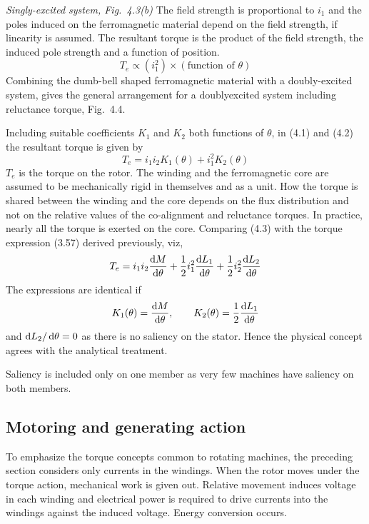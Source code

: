 \documentclass[a4paper,numbers=noenddot,12pt]{scrbook}
\begin{document}
            \noindent \textit{Singly-excited system, Fig.\ 4.3(b)} The field strength is proportional to $i_1$ and the poles induced on the ferromagnetic material depend on the field strength, if linearity is assumed. The resultant torque is the product of the field strength, the induced pole strength and a function of position. 
            \begin{equation}
                T_e \propto (i_1^2) \times (\text{function of } \theta)
                \label{eq:Eq4.2}
            \end{equation}
            Combining the dumb-bell shaped ferromagnetic material with a doubly-excited system, gives the general arrangement for a doubly­excited system including reluctance torque, Fig.\ 4.4.

            Including suitable coefficients $K_1$ and $K_2$ both functions of $\theta$, in (4.1) and (4.2) the resultant torque is given by
            \begin{equation}
                T_e = i_1 i_2 K_1(\theta) + i_1^2 K_2 (\theta)
                \label{eq:Eq4.3}
            \end{equation}
            $T_e$ is the torque on the rotor. The winding and the ferromagnetic core are assumed to be mechanically rigid in themselves and as a unit. How the torque is shared between the winding and the core depends on the flux distribution and not on the relative values of the co-alignment and reluctance torques. In practice, nearly all the torque is exerted on the core. 
            Comparing (4.3) with the torque expression (3.57) derived previously, viz,
            \begin{equation*}
                T_e = i_1 i_2 \dfrac{\dif M}{\dif \theta} + \dfrac{1}{2} i_1^2 \dfrac{\dif L_1}{\dif \theta} + \dfrac{1}{2} i_2^2 \dfrac{\dif L_2}{\dif \theta}
            \end{equation*}
            The expressions are identical if 
            \begin{equation*}
                K_1 (\theta) = \dfrac{\dif M}{\dif \theta}, \qquad K_2(\theta) = \dfrac{1}{2} \dfrac{\dif L_1}{\dif \theta}
            \end{equation*}
            and $\dif L_2 / \dif \theta = 0$ as there is no saliency on the stator. Hence the physical concept agrees with the analytical treatment.

            Saliency is included only on one member as very few machines have saliency on both members.

            \subsection{Motoring and generating action}
            To emphasize the torque concepts common to rotating machines, the preceding section considers only currents in the windings. When the rotor moves under the torque action, mechanical work is given out. Relative movement induces voltage in each winding and electrical power is required to drive currents into the windings against the induced voltage. Energy conversion occurs.
\end{document}
